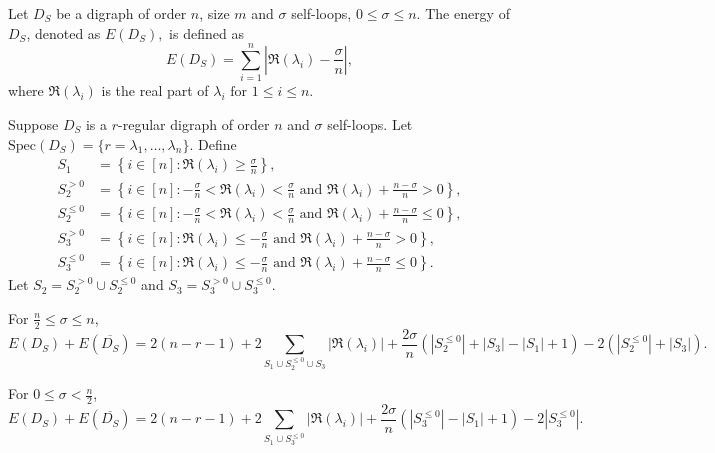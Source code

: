 \documentclass[10pt,a4paper]{amsart}
\begin{document}
\begin{definition}
	\label{E(D_S)}
	Let $D_S$ be a digraph of order $n$, size $m$ and $\sigma$ self-loops, $0 \leq \sigma \leq n$.
	The energy of $D_S$, denoted as $E(D_S),$ is defined as 
	\[
    E(D_S)=\sum_{i=1}^n \left | \Re(\lambda_i)-\frac{\sigma}{n} \right|,
    \]
	where $\Re(\lambda_i)$ is the real part of $\lambda_i \text{ for } 1 \leq i \leq n$.
\end{definition}

    \begin{theorem}
        \label{sum_of_E_and_E_comp}
        Suppose $D_S$ is a $r$-regular digraph of order $n$ and $\sigma$ self-loops. Let $\mathrm{Spec}(D_S)=\{r=\lambda_1, \ldots, \lambda_n\}$. Define 
        \begin{align*}
            S_1 &= \left\{ i \in [n] : \Re(\lambda_i) \geq \frac{\sigma}{n}   \right\}, \\
            S_2^{>0} &= \left\{ i \in [n] : -\frac{\sigma}{n} < \Re(\lambda_i) < \frac{\sigma}{n} \text{ and } \Re(\lambda_i) + \frac{n-\sigma}{n} > 0  \right\}, \\
            S_2^{\leq0} &= \left\{ i \in [n] : -\frac{\sigma}{n} <\Re(\lambda_i) < \frac{\sigma}{n} \text{ and } \Re(\lambda_i) + \frac{n-\sigma}{n} \leq 0  \right\}, \\
            S_3^{>0} &= \left\{ i \in [n] : \Re(\lambda_i) \leq -\frac{\sigma}{n} \text{ and } \Re(\lambda_i) + \frac{n-\sigma}{n} > 0  \right\}, \\
            S_3^{\leq 0} &= \left\{ i \in [n] : \Re(\lambda_i) \leq -\frac{\sigma}{n} \text{ and } \Re(\lambda_i) + \frac{n-\sigma}{n} \leq 0   \right\}.
        \end{align*}
        Let $S_2= S_2^{>0} \cup S_2^{\leq 0} $ and $S_3= S_3^{>0} \cup S_3^{\leq 0} $.
        
        For $\frac{n}{2} \leq \sigma \leq n $,
        \begin{equation}
            \label{energy_sum_complement_1}
            E(D_S)+E(\overline{D_S})= 2(n-r-1)+2\sum_{S_1 \cup S_2^{\leq 0} \cup S_3 }|\Re(\lambda_i)|+\frac{2\sigma}{n}(|S_2^{\leq 0}|+|S_3|-|S_1|+1) -2(|S_2^{\leq 0}|+|S_3|).
        \end{equation}

        For $0\leq\sigma < \frac{n}{2}$,
        \begin{equation}
         \label{energy_sum_complement_2}
            E(D_S)+E(\overline{D_S}) = 2(n-r-1)+2\sum_{S_1 \cup S_3^{\leq 0} }|\Re(\lambda_i)|+ \frac{2\sigma}{n}(|S_3^{\leq 0}|-|S_1|+1) -2|S_3^{\leq 0}|.
        \end{equation}
    \end{theorem}
\end{document}
